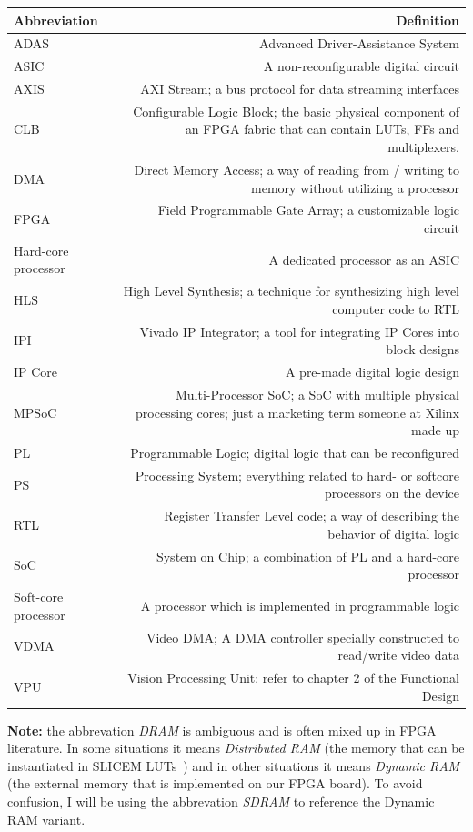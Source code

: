 \documentclass{matthijs}
\begin{document}

	\thispagestyle{empty}

	\begin{inhoudspagina}

		\clearpage

			\begin{tabular*}{\textwidth}{l @{\extracolsep{\fill}} R}
				\toprule

				\textbf{Abbreviation} & \textbf{Definition} \\
				\midrule

				ADAS & Advanced Driver-Assistance System \tabularnewline
				ASIC & A non-reconfigurable digital circuit \tabularnewline
				AXIS & AXI Stream; a bus protocol for data streaming interfaces \tabularnewline
				CLB & Configurable Logic Block; the basic physical component of an FPGA fabric that can contain LUTs, FFs and multiplexers. \tabularnewline
				DMA & Direct Memory Access; a way of reading from / writing to memory without utilizing a processor \tabularnewline
				FPGA & Field Programmable Gate Array; a customizable logic circuit \tabularnewline
				Hard-core processor & A dedicated processor as an ASIC \tabularnewline
				HLS & High Level Synthesis; a technique for synthesizing high level computer code to RTL \tabularnewline
				IPI & Vivado IP Integrator; a tool for integrating IP Cores into block designs \tabularnewline
				IP Core & A pre-made digital logic design \tabularnewline
				MPSoC & Multi-Processor SoC; a SoC with multiple physical processing cores; just a marketing term someone at Xilinx made up \tabularnewline
				PL & Programmable Logic; digital logic that can be reconfigured \tabularnewline
				PS & Processing System; everything related to hard- or softcore processors on the device \tabularnewline
				RTL & Register Transfer Level code; a way of describing the behavior of digital logic \tabularnewline
				SoC & System on Chip; a combination of PL and a hard-core processor \tabularnewline
				Soft-core processor & A processor which is implemented in programmable logic \tabularnewline
				VDMA & Video DMA; A DMA controller specially constructed to read/write video data \tabularnewline
				VPU & Vision Processing Unit; refer to chapter 2 of the Functional Design \tabularnewline

				\bottomrule
			\end{tabular*}

		\vspace{3ex}

		\textbf{Note:} the abbrevation \textit{DRAM} is ambiguous and is often mixed up in FPGA literature.
		In some situations it means \textit{Distributed RAM} (the memory that can be instantiated in SLICEM LUTs~\cite{xilinxug474}) and in other situations it means \textit{Dynamic RAM} (the external memory that is implemented on our FPGA board).
		To avoid confusion, I will be using the abbrevation \textit{SDRAM} to reference the Dynamic RAM variant.

	\end{inhoudspagina}
\end{document}
